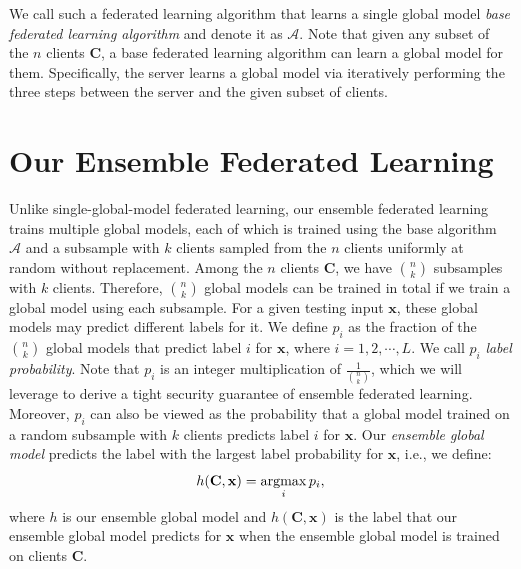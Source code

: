 \documentclass[letterpaper]{article} %
\newcommand{\argmax}{\operatornamewithlimits{argmax}}
\begin{document}
We call such a federated learning algorithm that learns a single global model  \emph{base federated learning algorithm} and denote it as $\mathcal{A}$. Note that given any subset of the $n$ clients $\mathbf{C}$, a base federated learning algorithm can learn a global model for them. Specifically, the server learns a global model via iteratively performing the three steps between the server and the given subset of clients. 


\section{Our Ensemble Federated Learning}

Unlike single-global-model federated learning, our ensemble federated learning trains multiple global models, each of which is trained using the base algorithm $\mathcal{A}$ and a subsample with $k$ clients sampled from the $n$ clients uniformly at random without replacement. Among the $n$ clients $\mathbf{C}$, we have ${n \choose k}$ subsamples with $k$ clients. Therefore,   ${n \choose k}$ global models can be trained in total if we train a global model using each subsample. For a given testing input $\mathbf{x}$, these global models may predict different labels for it. We define $p_i$ as the fraction of the ${n \choose k}$ global models that predict label $i$ for $\mathbf{x}$, where $i=1,2,\cdots, L$. We call $p_i$ \emph{label probability}. Note that $p_i$ is an integer multiplication of  $\frac{1}{{n \choose k}}$, which we will leverage to derive a tight security guarantee of ensemble federated learning. Moreover, $p_i$ can also be viewed as the probability that a global model trained on a random subsample with $k$ clients predicts label $i$ for $\mathbf{x}$. 
 Our \emph{ensemble global model} predicts the label with the largest label probability for $\mathbf{x}$, i.e., we define:
\begin{equation}
    h(\mathbf{C},\mathbf{x}) = \argmax_i p_i,
    \label{eq:define_k}
\end{equation}
where $h$ is our {ensemble global model} and $h(\mathbf{C}, \mathbf{x})$ is the label that our {ensemble global model} predicts for $\mathbf{x}$ when the ensemble global model is trained on clients $\mathbf{C}$. 
\end{document}
